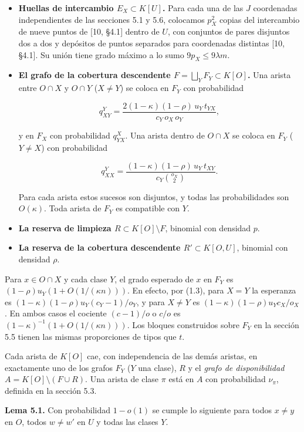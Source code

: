\documentclass[spanish,11pt,a4paper]{article}
\begin{document}
\begin{itemize}
\item
  \textbf{Huellas de intercambio \(E_X\subset K[U]\).} Para cada una de las \(J\) coordenadas independientes de las secciones 5.1 y 5.6, colocamos \(p_X^2\) copias del intercambio de nueve puntos de {[}10, §4.1{]} dentro de \(U\), con conjuntos de pares disjuntos dos a dos y depósitos de puntos separados para coordenadas distintas {[}10, §4.1{]}. Su unión tiene grado máximo a lo sumo \(9p_X\le9\lambda m\).
\item
  \textbf{El grafo de la cobertura descendente \(F=\bigsqcup_YF_Y\subset K[O]\).} Una arista entre \(O\cap X\) y \(O\cap Y\) (\(X\ne Y\)) se coloca en \(F_Y\) con probabilidad

  \[q^Y_{XY}=\frac{2(1-\kappa)(1-\rho)\,u_Y\,t_{YX}}{c_Y\,o_X\,o_Y},\]

  y en \(F_X\) con probabilidad \(q^X_{YX}\). Una arista dentro de \(O\cap X\) se coloca en \(F_Y\) (\(Y\ne X\)) con probabilidad

  \[q^Y_{XX}=\frac{(1-\kappa)(1-\rho)\,u_Y\,t_{XY}}{c_Y\binom{o_X}{2}}.\]

  Para cada arista estos sucesos son disjuntos, y todas las probabilidades son \(O(\kappa)\). Toda arista de \(F_Y\) es compatible con \(Y\).
\item
  \textbf{La reserva de limpieza \(R\subset K[O]\setminus F\)}, binomial con densidad \(p\).
\item
  \textbf{La reserva de la cobertura descendente \(R'\subset K[O,U]\)}, binomial con densidad \(\rho\).
\end{itemize}

Para \(x\in O\cap X\) y cada clase \(Y\), el grado esperado de \(x\) en \(F_Y\) es \((1-\rho)u_Y(1+O(1/(\kappa n)))\). En efecto, por (1.3), para \(X=Y\) la esperanza es \((1-\kappa)(1-\rho)u_Y(c_Y-1)/o_Y\), y para \(X\ne Y\) es \((1-\kappa)(1-\rho)u_Yc_X/o_X\). En ambos casos el cociente \((c-1)/o\) o \(c/o\) es \((1-\kappa)^{-1}(1+O(1/(\kappa n)))\). Los bloques construidos sobre \(F_Y\) en la sección 5.5 tienen las mismas proporciones de tipos que \(t\).

Cada arista de \(K[O]\) cae, con independencia de las demás aristas, en exactamente uno de los grafos \(F_Y\) (\(Y\) una clase), \(R\) y el \emph{grafo de disponibilidad} \(A=K[O]\setminus(F\cup R)\). Una arista de clase \(\pi\) está en \(A\) con probabilidad \(\nu_\pi\), definida en la sección 5.3.

\textbf{Lema 5.1.} Con probabilidad \(1-o(1)\) se cumple lo siguiente para todos \(x\ne y\) en \(O\), todos \(w\ne w'\) en \(U\) y todas las clases \(Y\).
\end{document}

